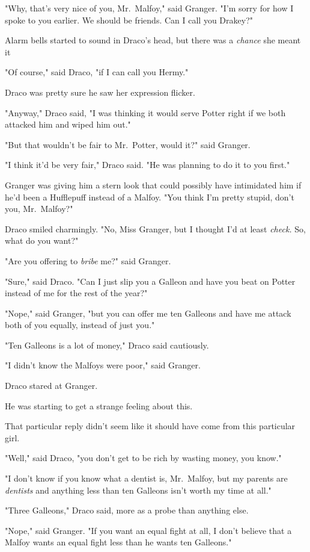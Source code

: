 "Why, that's very nice of you, Mr.~Malfoy," said Granger. "I'm sorry for how I
spoke to you earlier. We should be friends. Can I call you Drakey?"

Alarm bells started to sound in Draco's head, but there was a \emph{chance} she
meant it{\el}

"Of course," said Draco, "if I can call you Hermy."

Draco was pretty sure he saw her expression flicker.

"Anyway," Draco said, "I was thinking it would serve Potter right if we both
attacked him and wiped him out."

"But that wouldn't be fair to Mr.~Potter, would it?" said Granger.

"I think it'd be very fair," Draco said. "He was planning to do it to you
first."

Granger was giving him a stern look that could possibly have intimidated him if
he'd been a Hufflepuff instead of a Malfoy. "You think I'm pretty stupid, don't
you, Mr.~Malfoy?"

Draco smiled charmingly. "No, Miss Granger, but I thought I'd at least
\emph{check.} So, what do you want?"

"Are you offering to \emph{bribe} me?" said Granger.

"Sure," said Draco. "Can I just slip you a Galleon and have you beat on Potter
instead of me for the rest of the year?"

"Nope," said Granger, "but you can offer me ten Galleons and have me attack
both of you equally, instead of just you."

"Ten Galleons is a lot of money," Draco said cautiously.

"I didn't know the Malfoys were poor," said Granger.

Draco stared at Granger.

He was starting to get a strange feeling about this.

That particular reply didn't seem like it should have come from this particular
girl.

"Well," said Draco, "you don't get to be rich by wasting money, you know."

"I don't know if you know what a dentist is, Mr.~Malfoy, but my parents are
\emph{dentists} and anything less than ten Galleons isn't worth my time at all."

"Three Galleons," Draco said, more as a probe than anything else.

"Nope," said Granger. "If you want an equal fight at all, I don't believe that
a Malfoy wants an equal fight less than he wants ten Galleons."

